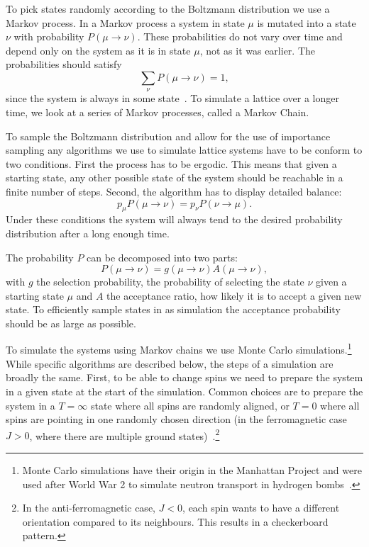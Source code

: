 \documentclass[11pt, a4paper]{report} %
\begin{document}
To pick states randomly according to the Boltzmann distribution we use a Markov process.
In a Markov process a system in state \(\mu\) is mutated into a state \(\nu\) with probability \(P(\mu\to\nu)\).
These probabilities do not vary over time and depend only on the system as it is in state \(\mu\), not as it was earlier.
The probabilities should satisfy
\begin{equation}
	\sum_{\nu} P(\mu \to \nu) = 1,
\end{equation}
since the system is always in some state~\cite{newman:1999,landau:2015}.
To simulate a lattice over a longer time, we look at a series of Markov processes, called a Markov Chain.

To sample the Boltzmann distribution and allow for the use of importance sampling any algorithms we use to simulate lattice systems have to be conform to two conditions.
First the process has to be ergodic.
This means that given a starting state, any other possible state of the system should be reachable in a finite number of steps.
Second, the algorithm has to display detailed balance:
\begin{equation}\label{eq:detailed_balance}
	p_{\mu} P(\mu \to \nu) = p_{\nu} P(\nu \to \mu).
\end{equation}
Under these conditions the system will always tend to the desired probability distribution after a long enough time.

The probability \(P\) can be decomposed into two parts:
\begin{equation}
	P(\mu\to\nu) = g(\mu\to\nu) A(\mu\to \nu),
\end{equation}
with \(g\) the selection probability, the probability of selecting the state \(\nu\) given a starting state \(\mu\) and \(A\) the acceptance ratio, how likely it is to accept a given new state.
To efficiently sample states in as simulation the acceptance probability should be as large as possible.

To simulate the systems using Markov chains we use Monte Carlo simulations.\footnote{Monte Carlo simulations have their origin in the Manhattan Project and were used after World War 2 to simulate neutron transport in hydrogen bombs~\cite{newman:1999}.}
While specific algorithms are described below, the steps of a simulation are broadly the same.
First, to be able to change spins we need to prepare the system in a given state at the start of the simulation.
Common choices are to prepare the system in a \(T=\infty\) state where all spins are randomly aligned, or \(T=0\) where all spins are pointing in one randomly chosen direction (in the ferromagnetic case \(J>0\), where there are multiple ground states)~\cite{newman:1999}.\footnote{In the anti-ferromagnetic case, \(J < 0\), each spin wants to have a different orientation compared to its neighbours. This results in a checkerboard pattern.}
\end{document}
